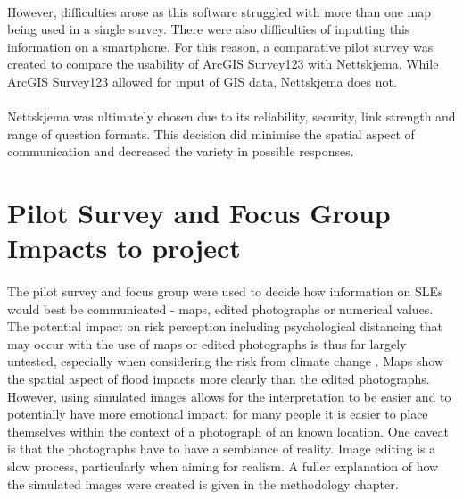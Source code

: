 \paragraph{}

However, difficulties arose as this software struggled with more than one map being used in a single survey. There were also difficulties of inputting this information on a smartphone. For this reason, a comparative pilot survey was created to compare the usability of ArcGIS Survey123 with Nettskjema. While ArcGIS Survey123 allowed for input of GIS data, Nettskjema does not.
\paragraph{}
Nettskjema was ultimately chosen due to its reliability, security, link strength and range of question formats.  This decision did minimise the spatial aspect of communication and decreased the variety in possible responses.
\section{Pilot Survey and Focus Group Impacts to project}
 
\paragraph{}
The pilot survey and focus group were used to decide how information on SLEs would best be communicated - maps, edited photographs or numerical values. The potential impact on risk perception  including psychological distancing that may occur with the use of maps or edited photographs is thus far largely untested, especially when considering the risk from climate change \cite{retchless_understanding_2018} \cite{spence_psychological_2012}. Maps show the spatial aspect of flood impacts more clearly than the edited photographs. However, using simulated images allows for the interpretation to be easier and to potentially have more emotional impact: for many people it is easier to place themselves within the context of a photograph of an known location. One caveat is that the photographs have to have a semblance of reality. Image editing is a slow process, particularly when aiming for realism.  A fuller explanation of how the simulated images were created is given in the methodology chapter. 
\paragraph{}

